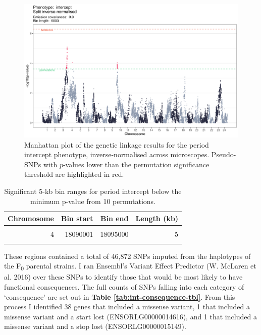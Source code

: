 \documentclass[
]{book}
\begin{document}
\begin{figure}
\includegraphics[width=1\linewidth]{figs/somites/manhattan_intercept} \caption{Manhattan plot of the genetic linkage results for the period intercept phenotype, inverse-normalised across microscopes. Pseudo-SNPs with \(p\)-values lower than the permutation significance threshold are highlighted in red.}\label{fig:somite-manhattan}
\end{figure}

\begin{table}

\caption{\label{tab:somite-sig-int-tbl}Significant 5-kb bin ranges for period intercept below the minimum p-value from 10 permutations.}
\centering
\begin{tabular}[t]{rrrr}
\toprule
Chromosome & Bin start & Bin end & Length (kb)\\
\midrule
\cellcolor{gray!6}{3} & \cellcolor{gray!6}{31880001} & \cellcolor{gray!6}{35420000} & \cellcolor{gray!6}{3540}\\
4 & 18090001 & 18095000 & 5\\
\cellcolor{gray!6}{10} & \cellcolor{gray!6}{2995001} & \cellcolor{gray!6}{3690000} & \cellcolor{gray!6}{695}\\
\bottomrule
\end{tabular}
\end{table}

These regions contained a total of 46,872 SNPs imputed from the haplotypes of the F\textsubscript{0} parental strains. I ran Ensembl's Variant Effect Predictor (W. McLaren et al. 2016) over these SNPs to identify those that would be most likely to have functional consequences. The full counts of SNPs falling into each category of `consequence' are set out in \textbf{Table \ref{tab:int-consequence-tbl}}. From this process I identified 38 genes that included a missense variant, 1 that included a missense variant and a start lost (ENSORLG00000014616), and 1 that included a missense variant and a stop lost (ENSORLG00000015149).
\end{document}
